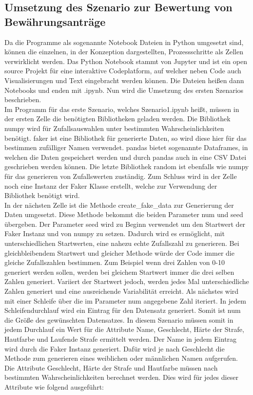 \begin{onehalfspace}
\subsection{Umsetzung des Szenario zur Bewertung von Bewährungsanträge}
\label{umsetzungsz1}
Da die Programme als sogenannte Notebook Dateien in Python umgesetzt sind, können die einzelnen, in der Konzeption dargestellten, Prozessschritte als Zellen verwirklicht werden. Das Python Notebook stammt von Jupyter und ist ein open source Projekt für eine interaktive Codeplatform, auf welcher neben Code auch Visualisierungen und Text eingebracht werden können. Die Dateien heißen dann Notebooks und enden mit \glqq{}.ipynb\grqq{}. Nun wird die Umsetzung des ersten Szenarios beschrieben.\\
Im Programm für das erste Szenario, welches \glqq{}Szenario1.ipynb\grqq{} heißt, müssen in der ersten Zelle die benötigten Bibliotheken geladen werden.
Die Bibliothek \glqq{}numpy\grqq{} wird für Zufallsauswahlen unter bestimmten Wahrscheinlichkeiten benötigt. \glqq{}faker\grqq{} ist eine Bibliothek für generierte Daten, so wird diese hier für das bestimmen zufälliger Namen verwendet. \glqq{}pandas\grqq{} bietet sogenannte Dataframes, in welchen die Daten gespeichert werden und durch \glqq{}pandas\grqq{} auch in eine CSV Datei geschrieben werden können. Die letzte Bibliothek \glqq{}random\grqq{} ist ebenfalls wie \glqq{}numpy\grqq{} für das generieren von Zufallswerten zuständig. Zum Schluss wird in der Zelle noch eine Instanz der Faker Klasse erstellt, welche zur Verwendung der Bibliothek benötigt wird.\\
In der nächsten Zelle ist die Methode \glqq{}create\_fake\_data\grqq{} zur Generierung der Daten umgesetzt. Diese Methode bekommt die beiden Parameter \glqq{}num\grqq{} und \glqq{}seed\grqq{} übergeben. Der Parameter \glqq{}seed\grqq{} wird zu Beginn verwendet um den Startwert der Faker Instanz und von \glqq{}numpy\grqq{} zu setzen. Dadurch wird es ermöglicht, mit unterschiedlichen Startwerten, eine nahezu \glqq{}echte\grqq{} Zufallszahl zu generieren. Bei gleichbleibendem Startwert und gleicher Methode würde der Code immer die gleiche Zufallszahlen bestimmen. Zum Beispiel wenn drei Zahlen von 0-10 generiert werden sollen, werden bei gleichem Startwert immer die drei selben Zahlen generiert. Variiert der Startwert jedoch, werden jedes Mal unterschiedliche Zahlen generiert und eine ausreichende Variabilität erreicht. Als nächstes wird mit einer Schleife über die im Parameter \glqq{}num\grqq{} angegebene Zahl iteriert. In jedem Schleifendurchlauf wird ein Eintrag für den Datensatz generiert. Somit ist \glqq{}num\grqq{} die Größe des gewünschten Datensatzes. In diesem Szenario müssen somit in jedem Durchlauf ein Wert für die Attribute Name, Geschlecht, Härte der Strafe, Hautfarbe und Laufende Strafe ermittelt werden. Der Name in jedem Eintrag wird durch die Faker Instanz generiert. Dafür wird je nach Geschlecht die Methode zum generieren eines weiblichen oder männlichen Namen aufgerufen. Die Attribute Geschlecht, Härte der Strafe und Hautfarbe müssen nach bestimmten Wahrscheinlichkeiten berechnet werden. Dies wird für jedes dieser Attribute wie folgend ausgeführt:\\

\end{onehalfspace}
